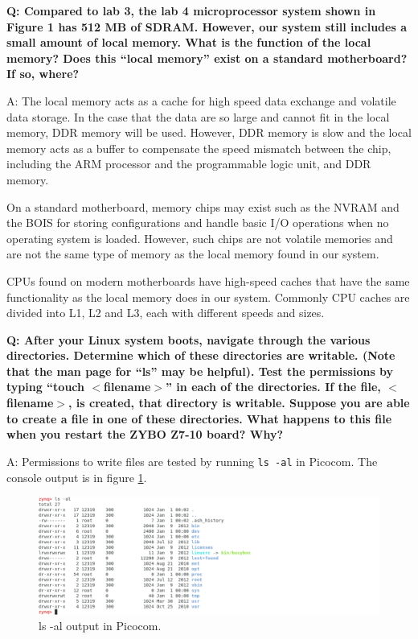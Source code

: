 \documentclass[11pt,letterpaper,titlepage]{article}
\begin{document}
\textbf{Q: Compared to lab 3, the lab 4 microprocessor system shown in Figure 1 has 512 MB of SDRAM. However, our system still includes a small amount of local memory. What is the function of the local memory? Does this ``local memory'' exist on a standard motherboard? If so, where?}

A: The local memory acts as a cache for high speed data exchange and volatile data storage. In the case that the data are so large and cannot fit in the local memory, DDR memory will be used. However, DDR memory is slow and the local memory acts as a buffer to compensate the speed mismatch between the chip, including the ARM processor and the programmable logic unit, and DDR memory. 

On a standard motherboard, memory chips may exist such as the NVRAM and the BOIS for storing configurations and handle basic I/O operations when no operating system is loaded. However, such chips are not volatile memories and are not the same type of memory as the local memory found in our system.

CPUs found on modern motherboards have high-speed caches that have the same functionality as the local memory does in our system. Commonly CPU caches are divided into L1, L2 and L3, each with different speeds and sizes.

\textbf{Q: After your Linux system boots, navigate through the various directories. Determine which of these directories are writable. (Note that the man page for ``ls'' may be helpful). Test the permissions by typing ``touch $<$filename$>$'' in each of the directories. If the file, $<$filename$>$, is created, that directory is writable. Suppose you are able to create a file in one of these directories. What happens to this file when you restart the ZYBO Z7-10 board? Why?}

A: Permissions to write files are tested by running \verb|ls -al| in Picocom. The console output is in figure \ref{ls_result}.

\begin{figure}[ht]
    \centering
    \includegraphics[width=\textwidth]{ls.png}
    \caption{ls -al output in Picocom.}
    \label{ls_result}
\end{figure}
\end{document}
